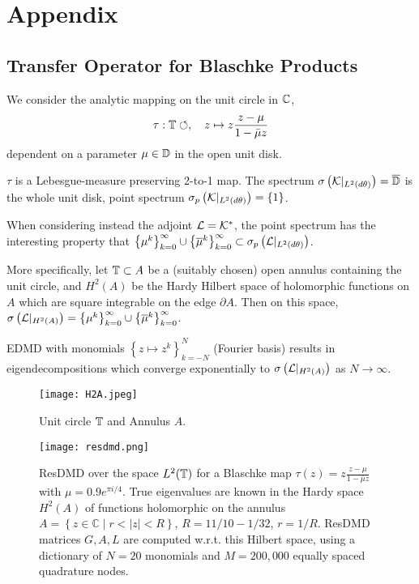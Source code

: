 
\section{Appendix}

\subsection{Transfer Operator for Blaschke Products}

We consider the analytic mapping on the unit circle in $\mathbb{C}$, 
\begin{equation*}
    \tau : \mathbb{T} \circlearrowleft, \quad z \mapsto z \frac{z - \mu}{1 - \bar{\mu} z} 
\end{equation*}
dependent on a parameter $\mu \in \mathbb{D}$ in the open unit disk. 

$\tau$ is a Lebesgue-measure preserving 2-to-1 map. The spectrum 
$\sigma \left( \mathcal{K} \vert_{L^2 (d\theta)} \right) = \overline{\mathbb{D}}$ is the whole unit 
disk, point spectrum 
$\sigma_p \left( \mathcal{K} \vert_{L^2 (d\theta)} \right) = \left\{ 1 \right\}$. 

When considering instead the adjoint $\mathcal{L} = \mathcal{K}^*$, the point spectrum has the 
interesting property that 
$\left\{ \mu^k \right\}_{k=0}^\infty \cup \left\{ \overline{\mu}^k \right\}_{k=0}^\infty \subset \sigma_p \left( \mathcal{L} \vert_{L^2 (d\theta)} \right)$. 

More specifically, let $\mathbb{T} \subset A$ be a (suitably chosen) open annulus containing the 
unit circle, and $H^2 (A)$ be the Hardy Hilbert space of holomorphic functions on $A$ which 
are square integrable on the edge $\partial A$. Then on this space, 
$\sigma \left( \mathcal{L} \vert_{H^2 (A)} \right) = \left\{ \mu^k \right\}_{k=0}^\infty \cup \left\{ \overline{\mu}^k \right\}_{k=0}^\infty$. 

EDMD with monomials $\left\{ z \mapsto z^k \right\}_{k=-N}^N$ (Fourier basis) results in 
eigendecompositions which converge exponentially to 
$\sigma \left( \mathcal{L} \vert_{H^2 (A)} \right)$ as $N \to \infty$. 


\begin{figure}
    \texttt{[image: H2A.jpeg]}
    \caption{
        Unit circle $\mathbb{T}$ and Annulus $A$. 
    }
\end{figure}

\begin{figure}
    \texttt{[image: resdmd.png]}
    \caption{
        ResDMD over the space $L^2(\mathbb{T})$ for a Blaschke map 
        $\tau (z) = z \frac{z - \mu}{1 - \bar{\mu} z}$ with $\mu = 0.9 e^{\pi i / 4}$. 
        True eigenvalues are known in the Hardy space $H^2 (A)$ of functions holomorphic on 
        the annulus 
        $A = \left\{ z \in \mathbb{C} \mid r < |z| < R \right\}$, 
        $R = 11/10 - 1/32$, $r = 1/R$. ResDMD matrices $G, A, L$ are computed w.r.t. this   
        Hilbert space, using a dictionary of $N = 20$ monomials and $M = 200,000$
        equally spaced quadrature nodes. 
    }
    \label{fig:resdmd}
\end{figure}

